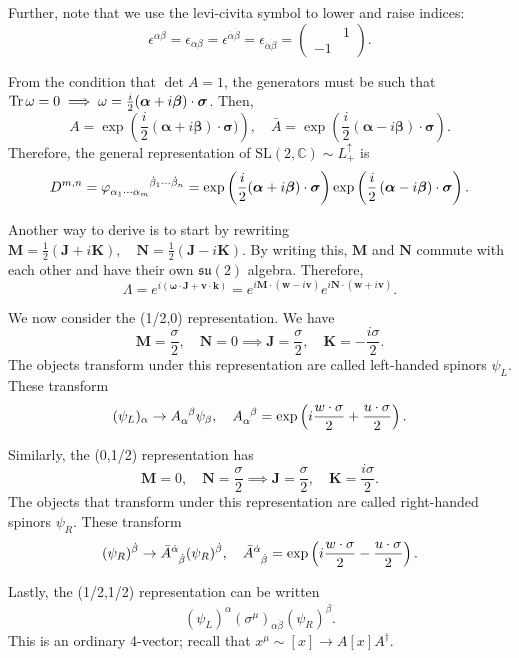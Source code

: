 \documentclass{article}
\begin{document}
Further, note that we use the levi-civita symbol to lower and raise indices:
$$\epsilon^{\alpha\beta}=\epsilon_{\alpha\beta}=\epsilon^{\dot\alpha\dot\beta}=\epsilon_{\dot\alpha\dot\beta}=\begin{pmatrix}&1\\-1&\end{pmatrix}.$$

From the condition that $\det A=1$, the generators must be such that $\Tr \omega=0\implies\omega=\frac i2(\boldsymbol\alpha+i\boldsymbol\beta)\cdot\boldsymbol\sigma$. Then, 
$$A=\exp\left(\frac i2(\boldsymbol\alpha+i\boldsymbol\beta)\cdot\boldsymbol\sigma)\right),\quad\bar A=\exp\left(\frac i2\left(\boldsymbol\alpha-i\boldsymbol\beta\right)\cdot\boldsymbol\sigma\right).$$
Therefore, the general representation of $\mathrm{SL}(2,\mathbb C)\sim L^\uparrow_+$ is 
$$D^{m,n}=\varphi\indices{_{\alpha_1\cdots\alpha_m}^{\dot\beta_1\cdots\dot\beta_n}}=\exp\left(\frac i2(\boldsymbol\alpha+i\boldsymbol\beta)\cdot\boldsymbol\sigma\right)\exp\left(\frac i2\left(\boldsymbol\alpha-i\boldsymbol\beta\right)\cdot\boldsymbol\sigma\right).$$

Another way to derive is to start by rewriting $\mathbf M=\frac 12(\mathbf J+i\mathbf K),\quad\mathbf N=\frac 12(\mathbf J-i\mathbf K)$. By writing this, $\mathbf M$ and $\mathbf N$ commute with each other and have their own $\mathfrak{su}(2)$ algebra. Therefore, 
$$\Lambda=e^{i(\mathbf\omega\cdot\mathbf J+\mathbf v\cdot\mathbf k)}=e^{i\mathbf M\cdot(\mathbf w-i\mathbf v)}e^{i\mathbf N\cdot(\mathbf w+i\mathbf v)}.$$

We now consider the (1/2,0) representation. We have 
$$\mathbf M=\frac{\sigma}2,\quad\mathbf N=0\implies\mathbf J=\frac{\sigma}2,\quad\mathbf K=-\frac{i\sigma}2.$$
The objects transform under this representation are called left-handed spinors $\psi_L$. These transform
$$(\psi_L)_\alpha\to A\indices{_\alpha^\beta}\psi_\beta,\quad A\indices{_\alpha^\beta}=\exp\left(i\frac{w\cdot\sigma}{2}+\frac{u\cdot\sigma}2\right).$$

Similarly, the (0,1/2) representation has
$$\mathbf M=0,\quad \mathbf N=\frac{\sigma}2\implies \mathbf J=\frac{\sigma}2,\quad \mathbf K=\frac{i\sigma}2.$$
The objects that transform under this representation are called right-handed spinors $\psi_R$. These transform
$$(\psi_R)^{\dot\beta}\to\bar A\indices{^{\dot\alpha}_{\dot\beta}}(\psi_R)^{\dot\beta},\quad\bar A\indices{^{\dot\alpha}_{\dot\beta}}=\exp\left(i\frac{w\cdot\sigma}2-\frac{u\cdot\sigma}2\right).$$

Lastly, the (1/2,1/2) representation can be written 
$$(\psi_L)^\alpha(\sigma^\mu)_{\alpha\dot\beta}(\psi_R)^{\dot\beta}.$$
This is an ordinary 4-vector; recall that $x^\mu\sim [x]\to A[x]A^\dag$.
\end{document}

